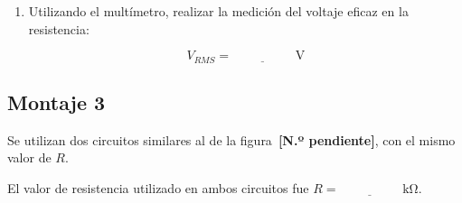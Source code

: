 \documentclass{article}
\newcommand{\vacio}[1][2cm]{\underline{\hspace{#1}}}
\newcommand{\figpend}{figura~\textbf{[N.º pendiente]}}
\begin{document}
\begin{enumerate}
        \item Utilizando el multímetro, realizar la medición del voltaje eficaz en la resistencia:

        \[
            V_{RMS} = \vacio\ \si{\volt}
        \]
    \end{enumerate}

    \subsection{Montaje 3}

    Se utilizan dos circuitos similares al de la \figpend{}, con el mismo valor de $R$.

    El valor de resistencia utilizado en ambos circuitos fue $R = \vacio\ \si{\kilo\ohm}$.
\end{document}
